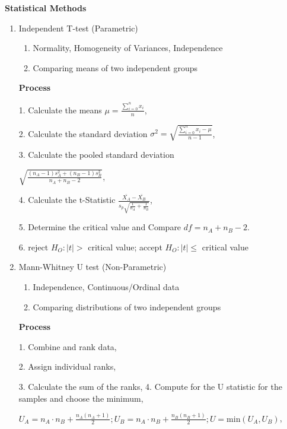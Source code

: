 \documentclass[4pt]{article}
\begin{document}
\begin{multicols*}{2}
    \textbf{Statistical Methods}

    \begin{enumerate}
        \item Independent T-test (Parametric)
        \begin{enumerate}
            \item Normality, Homogeneity of Variances, Independence
            \item Comparing means of two independent groups
        \end{enumerate}
        \textbf{Process}

            1. Calculate the means 
            $ \mu = \frac{\sum_{i=0}^{n}{x_i}}{n}$,

            2. Calculate the standard deviation
            $ \sigma^2 = \sqrt{\frac{\sum_{i=0}^{n}{x_i - \mu}}{n-1}}$, 

            3. Calculate the pooled standard deviation 
            
            $\sqrt{\frac{(n_A-1)s_A^2+(n_B-1)s_B^2}{n_A+n_B-2}}$, 

            4. Calculate the t-Statistic 
            $ \frac{\bar{X_A} - \bar{X_B}}{s_p\sqrt{\frac{1}{n_A}+\frac{1}{n_B}}}$,

            5. Determine the critical value and Compare
            $df = n_A + n_B - 2$.

            6. reject $H_O: |t| >$ critical value; accept $H_O: |t| \leq$ critical value


        \item Mann-Whitney U test (Non-Parametric)
        \begin{enumerate}
            \item Independence, Continuous/Ordinal data
            \item Comparing distributions of two independent groups
        \end{enumerate}
        \textbf{Process}

            1. Combine and rank data,

            2. Assign individual ranks, 

            3. Calculate the sum of the ranks,
            4.
            Compute for the U statistic for the samples and choose the minimum,
            
            $ U_A = n_A \cdot n_B + \frac{n_A(n_A+1)}{2}; U_B = n_A \cdot n_B + \frac{n_B(n_B+1)}{2}; U = \text{min}(U_A,U_B)$,


\end{enumerate}
\end{multicols*}
\end{document}

